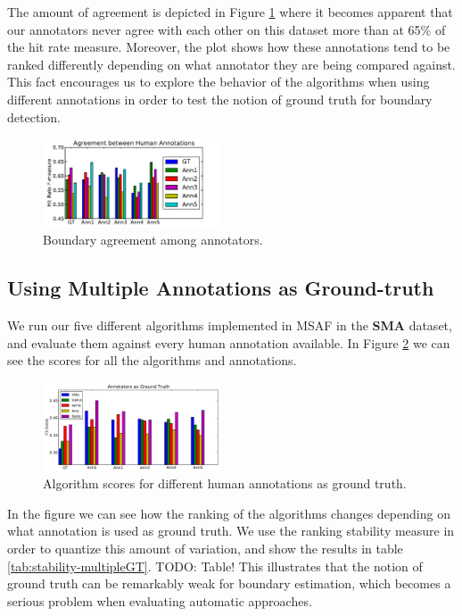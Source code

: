 \documentclass{article}
\begin{document}
The amount of agreement is depicted in Figure \ref{fig:human-agreement} where it becomes apparent that our annotators never agree with each other on this dataset more than at 65\% of the hit rate measure.
Moreover, the plot shows how these annotations tend to be ranked differently depending on what annotator they are being compared against.
This fact encourages us to explore the behavior of the algorithms when using different annotations in order to test the notion of ground truth for boundary detection.

\begin{figure}
  \centering
  \includegraphics[width=0.47\textwidth]{plots/human-agreement.pdf}
  \caption{Boundary agreement among annotators.}
  \label{fig:human-agreement}
\end{figure}%


\subsection{Using Multiple Annotations as Ground-truth}

We run our five different algorithms implemented in MSAF in the \textbf{SMA} dataset, and evaluate them against every human annotation available.
In Figure \ref{fig:annotatorsAsGT} we can see the scores for all the algorithms and annotations.

\begin{figure}
  \centering
  \includegraphics[width=0.47\textwidth]{plots/AnnotatorsAsGT.pdf}
  \caption{Algorithm scores for different human annotations as ground truth.}
  \label{fig:annotatorsAsGT}
\end{figure}%

In the figure we can see how the ranking of the algorithms changes depending on what annotation is used as ground truth.
We use the ranking stability measure in order to quantize this amount of variation, and show the results in table \ref{tab:stability-multipleGT}.
TODO: Table!
This illustrates that the notion of ground truth can be remarkably weak for boundary estimation, which becomes a serious problem when evaluating automatic approaches.
\end{document}
